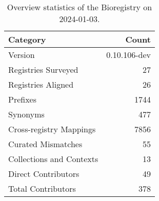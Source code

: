 \begin{table}
\caption{Overview statistics of the Bioregistry on 2024-01-03.}
\label{tab:bioregistry-summary}
\begin{tabular}{lr}
\toprule
Category & Count \\
\midrule
Version & 0.10.106-dev \\
Registries Surveyed & 27 \\
Registries Aligned & 26 \\
Prefixes & 1744 \\
Synonyms & 477 \\
Cross-registry Mappings & 7856 \\
Curated Mismatches & 55 \\
Collections and Contexts & 13 \\
Direct Contributors & 49 \\
Total Contributors & 378 \\
\bottomrule
\end{tabular}
\end{table}
